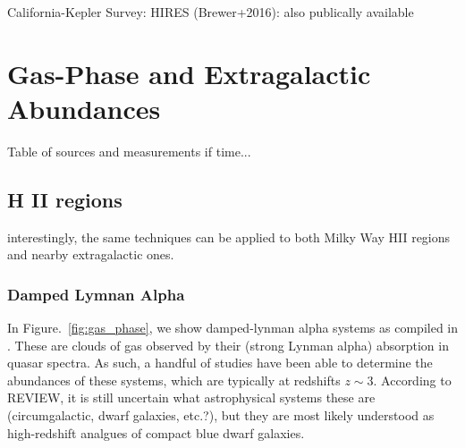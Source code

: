 \documentclass[11pt]{article}
\begin{document}
California-Kepler Survey: HIRES (Brewer+2016): also publically available




\section{Gas-Phase and Extragalactic Abundances}

Table of sources and measurements if time...

\subsection{H II regions}
interestingly, the same techniques can be applied to both Milky Way HII regions and nearby extragalactic ones. 

\subsubsection{Damped Lymnan Alpha}
In Figure.~\ref{fig:gas_phase}, we show damped-lynman alpha systems as compiled in \citet{cooke+17}. These are clouds of gas observed by their (strong Lynman alpha) absorption in quasar spectra. As such, a handful of studies have been able to determine the abundances of these systems, which are typically at redshifts $z\sim 3$. 
According to REVIEW, it is still uncertain what astrophysical systems these are (circumgalactic, dwarf galaxies, etc.?), but they are most likely understood as high-redshift analgues of compact blue dwarf galaxies.
\end{document}
